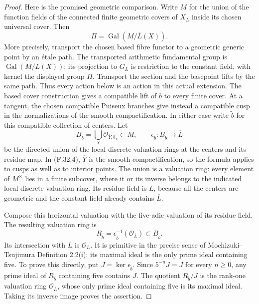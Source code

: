\begin{proof}
Here is the promised geometric comparison.
Write $M$ for the union of the function fields
of the connected finite geometric covers of
$X_{\overline L}$ inside its chosen universal
cover.  Then
\[
 \Pi=\operatorname{Gal}(M/\overline L(X)).
\]
More precisely, transport the chosen based fibre
functor to a geometric generic point by an
\'etale path.  The transported arithmetic
fundamental group is
$\operatorname{Gal}(M/L(X))$; its projection to
$G_L$ is restriction to the constant field,
with kernel the displayed group $\Pi$.
Transport the section and the basepoint lifts
by the same path.  Thus every action below is
an action in this actual extension.
The based cover construction gives a compatible
lift of $b$ to every finite cover.
At a tangent, the chosen compatible Puiseux
branches give instead a compatible cusp in
the normalizations of the smooth compactification.
In either case write $\widetilde b$ for this
compatible collection of centers.
Let
\[
 B_{\widetilde b}
   =\bigcup_Y\mathcal O_{\overline Y,b_Y}
           \subset M,\qquad
 \epsilon_{\widetilde b}:B_{\widetilde b}
                  \longrightarrow\overline L            \tag{F.32.4}
\]
be the directed union of the local discrete
valuation rings at the centers and its residue
map.  In (F.32.4), $\overline Y$ is the smooth
compactification, so the formula applies to
cusps as well as to interior points.
The union is a valuation ring: every element
of $M^\times$ lies in a finite subcover, where
it or its inverse belongs to the indicated
local discrete valuation ring.
Its residue field is $\overline L$, because
all the centers are geometric and the constant
field already contains $\overline L$.

Compose this horizontal valuation with the
five-adic valuation of its residue field.
The resulting valuation ring is
\[
 R_{\widetilde b}
   =\epsilon_{\widetilde b}^{-1}
                       (\mathcal O_{\overline L})
                      \subset B_{\widetilde b}.           \tag{F.32.5}
\]
Its intersection with $L$ is $\mathcal O_L$.
It is primitive in the precise sense of
Mochizuki--Tsujimura Definition 2.2(i):
its maximal ideal is the only prime ideal
containing five.
To prove this directly, put
$J=\ker\epsilon_{\widetilde b}$.
Since $5^{-n}J=J$ for every $n\ge0$, any prime
ideal of $R_{\widetilde b}$ containing five
contains $J$.
The quotient $R_{\widetilde b}/J$ is the
rank-one valuation ring $\mathcal O_{\overline L}$,
whose only prime ideal containing five is its
maximal ideal.  Taking its inverse image proves
the assertion.


\end{proof}
